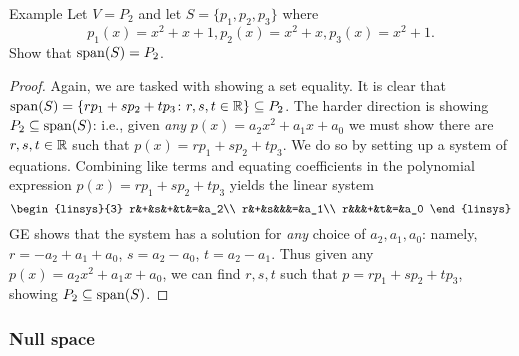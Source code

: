 \begin{frame}{Example}
Let $V=P_2$ and let $S=\{p_1, p_2, p_3\}$ where 
\[
p_1(x)=x^2+x+1, p_2(x)=x^2+x, p_3(x)=x^2+1.
\]
Show that $\operatorname{span}(S)=P_2$. 
\pause
\begin{proof}
Again, we are tasked with showing a \alert{set equality}. 
\bspace
It is clear that $\operatorname{span}(S)=\{rp_1+sp_2+tp_3\colon r,s,t\in{\mathbb R}\}\subseteq P_2$. 
\bspace
The harder direction is showing $P_2\subseteq \operatorname{span}(S)$: i.e., given {\em any} $p(x)=a_2x^2+a_1x+a_0$ we must show there are $r,s,t\in{\mathbb R}$ such that $p(x)=rp_1+sp_2+tp_3$. 
\bpause 
We do so by setting up a system of equations. Combining like terms and equating coefficients in the polynomial expression $p(x)=rp_1+sp_2+tp_3$ yields the linear system 
\[
\begin{linsys}{3}
r&+&s&+&t&=&a_2\\
r&+&s&&&=&a_1\\
r&&&+&t&=&a_0
\end{linsys}
\]
\pause GE shows that the system has a solution for {\em any} choice of $a_2, a_1, a_0$: namely, $r=-a_2+a_1+a_0$, $s=a_2-a_0$, $t=a_2-a_1$. Thus given any $p(x)=a_2x^2+a_1x+a_0$, we can find $r,s,t$ such that $p=rp_1+sp_2+tp_3$, showing $P_2\subseteq \operatorname{span}(S)$. 
\end{proof}
\end{frame}
\subsubsection*{Null space}

